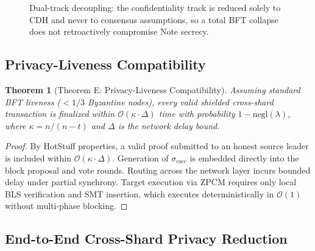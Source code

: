 \documentclass[sigconf,nonacm]{acmart}
\newtheorem{theorem}{Theorem}
\begin{document}
\begin{figure}[t]
\centering
{}
\caption{Dual-track decoupling: the confidentiality track is reduced solely to CDH and never to consensus assumptions, so a total BFT collapse does not retroactively compromise Note secrecy.}
\label{fig:dualtrack}
\end{figure}

\subsection{Privacy-Liveness Compatibility}

\begin{theorem}[Theorem E: Privacy-Liveness Compatibility]
Assuming standard BFT liveness ($< 1/3$ Byzantine nodes), every valid shielded cross-shard transaction is finalized within $\mathcal{O}(\kappa \cdot \Delta)$ time with probability $1 - \text{negl}(\lambda)$, where $\kappa = n / (n - t)$ and $\Delta$ is the network delay bound.
\end{theorem}

\begin{proof}
By HotStuff properties, a valid proof submitted to an honest source leader is included within $\mathcal{O}(\kappa \cdot \Delta)$. Generation of $\sigma_{\text{cscc}}$ is embedded directly into the block proposal and vote rounds. Routing across the network layer incurs bounded delay under partial synchrony. Target execution via ZPCM requires only local BLS verification and SMT insertion, which executes deterministically in $\mathcal{O}(1)$ without multi-phase blocking.
\end{proof}

\subsection{End-to-End Cross-Shard Privacy Reduction}
\end{document}
